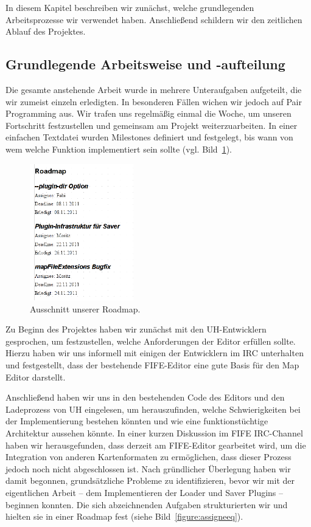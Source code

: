 In diesem Kapitel beschreiben wir zunächst, welche grundlegenden Arbeitsprozesse
wir verwendet haben. Anschließend schildern wir den zeitlichen Ablauf des
Projektes.

\subsection{Grundlegende Arbeitsweise und -aufteilung}
Die gesamte anstehende Arbeit wurde in mehrere Unteraufgaben aufgeteilt, die wir
zumeist einzeln erledigten.
In besonderen Fällen wichen wir jedoch auf Pair Programming aus. Wir trafen uns
regelmäßig einmal die Woche, um unseren Fortschritt festzustellen und gemeinsam
am Projekt weiterzuarbeiten. In einer einfachen Textdatei wurden Milestones
definiert und festgelegt, bis wann von wem welche Funktion implementiert sein
sollte (vgl. Bild~\ref{figure:assignee}).

\begin{figure}[htbp]
  \centering

    \includegraphics[width=0.4\textwidth]{gfx/assignee.png}

  \caption{Ausschnitt unserer Roadmap.}
  \label{figure:assignee}
\end{figure}

Zu Beginn des Projektes haben wir zunächst mit den UH-Entwicklern gesprochen,
um festzustellen, welche Anforderungen der Editor erfüllen sollte. Hierzu
haben wir uns informell mit einigen der Entwicklern im IRC unterhalten und
festgestellt, dass der bestehende FIFE-Editor eine gute Basis für den Map
Editor darstellt.

Anschließend haben wir uns in den bestehenden Code des Editors und den
Ladeprozess von UH eingelesen, um herauszufinden, welche Schwierigkeiten bei der
Implementierung bestehen könnten und wie eine funktionstüchtige Architektur
aussehen könnte.
In einer kurzen Diskussion im FIFE IRC-Channel haben wir herausgefunden, dass
derzeit am FIFE-Editor gearbeitet wird, um die Integration von anderen
Kartenformaten zu ermöglichen, dass dieser Prozess jedoch noch nicht
abgeschlossen ist. Nach gründlicher Überlegung haben wir damit begonnen,
grundsätzliche Probleme zu identifizieren, bevor wir mit der eigentlichen Arbeit
-- dem Implementieren der Loader und Saver Plugins -- beginnen konnten. Die sich
abzeichnenden Aufgaben strukturierten wir und hielten sie in einer Roadmap fest
(siehe Bild~\ref{figure:assigneeq}).

